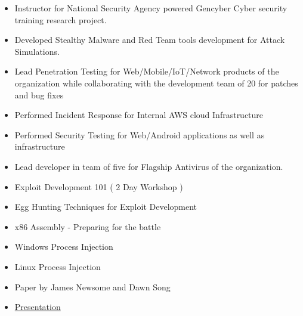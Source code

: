 \documentclass[10pt,a4paper,ragged2e]{altacv}
\begin{document}
\divider

\begin{itemize}
\item Instructor for National Security Agency powered Gencyber Cyber security training research project.
\smallskip
\item Developed Stealthy Malware and Red Team tools development for Attack Simulations.
\end{itemize}

\divider

\begin{itemize}
\item Lead Penetration Testing for Web/Mobile/IoT/Network products of the organization while collaborating with the development team of 20 for patches and bug fixes
\item Performed Incident Response for Internal AWS cloud Infrastructure
\end{itemize}

\divider

\begin{itemize}
\item Performed Security Testing for Web/Android applications as well as infrastructure
\smallskip
\item Lead developer in team of five for Flagship Antivirus of the organization.
\end{itemize}

\clearpage

\begin{itemize}
    \item Exploit Development 101 ( 2 Day Workshop )
    \item Egg Hunting Techniques for Exploit Development
    \item x86 Assembly - Preparing for the battle
    \item Windows Process Injection
    \item Linux Process Injection
\end{itemize}
\smallskip
\begin{itemize}
    \item Paper by James Newsome and Dawn Song
    \item \href{https://docs.google.com/presentation/d/1cTt7Vd5Duzwt5Z3EhzdaR0s-DWtVZ0qUQWKBs7SOBKE/edit?usp=sharing}{Presentation}
\end{itemize}
\smallskip
\divider
\end{document}
